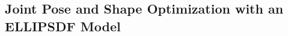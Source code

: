 








\subsection{Joint Pose and Shape Optimization with an ELLIPSDF Model}
\label{sec:shape_pose_inference}

